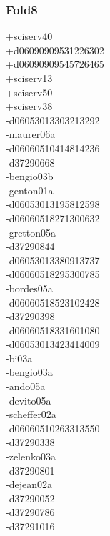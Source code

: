 \begin{multicols}{3}
\subsubsection*{Fold8}
+sciserv40\\
+d06090909531226302\\
+d06090909545726465\\
+sciserv13\\
+sciserv50\\
+sciserv38\\
-d06053013303213292\\
-maurer06a\\
-d06060510414814236\\
-d37290668\\
-bengio03b\\
-genton01a\\
-d06053013195812598\\
-d06060518271300632\\
-gretton05a\\
-d37290844\\
-d06053013380913737\\
-d06060518295300785\\
-bordes05a\\
-d06060518523102428\\
-d37290398\\
-d06060518331601080\\
-d06053013423414009\\
-bi03a\\
-bengio03a\\
-ando05a\\
-devito05a\\
-scheffer02a\\
-d06060510263313550\\
-d37290338\\
-zelenko03a\\
-d37290801\\
-dejean02a\\
-d37290052\\
-d37290786\\
-d37291016\\

\end{multicols}
